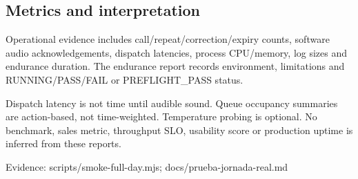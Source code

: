 \subsection{Metrics and interpretation}

Operational evidence includes call/repeat/correction/expiry counts, software audio acknowledgements, dispatch latencies, process CPU/memory, log sizes and endurance duration. The endurance report records environment, limitations and RUNNING/PASS/FAIL or PREFLIGHT\_PASS status.

Dispatch latency is not time until audible sound. Queue occupancy summaries are action-based, not time-weighted. Temperature probing is optional. No benchmark, sales metric, throughput SLO, usability score or production uptime is inferred from these reports.

Evidence: scripts/smoke-full-day.mjs; docs/prueba-jornada-real.md
